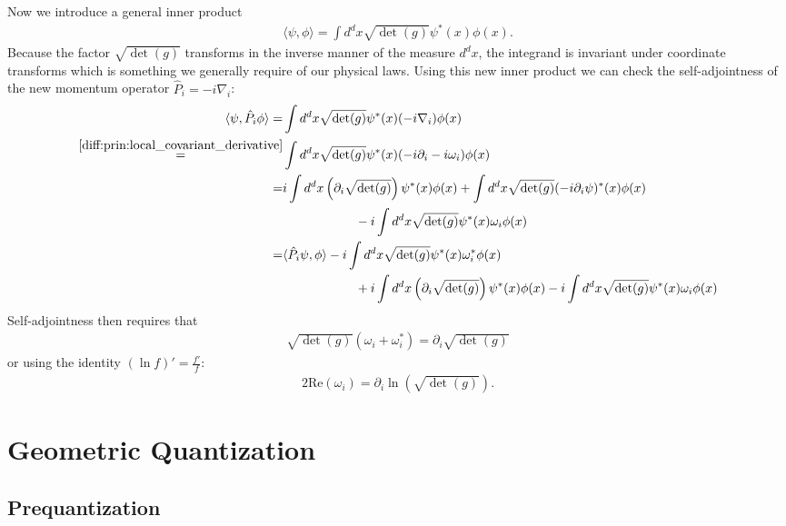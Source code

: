 \begin{construct}
		Now we introduce a general inner product
		\begin{gather}
			\langle\psi, \phi\rangle = \int d^dx\sqrt{\det(g)}\psi^*(x)\phi(x).
		\end{gather}
		Because the factor $\sqrt{\det(g)}$ transforms in the inverse manner of the measure $d^dx$, the integrand is invariant under coordinate transforms which is something we generally require of our physical laws. Using this new inner product we can check the self-adjointness of the new momentum operator $\hat{P}_i = -i\nabla_i$:
		\begin{align*}
			\langle\psi, \hat{P}_i\phi\rangle = &\int d^dx\sqrt{\det(g)}\psi^*(x)(-i\nabla_i)\phi(x)\\
			\overset{\ref{diff:prin:local_covariant_derivative}}{=} &\int d^dx\sqrt{\det(g)}\psi^*(x)(-i\partial_i - i\omega_i)\phi(x)\\
			= &i\int d^dx\left(\partial_i\sqrt{\det(g)}\right)\psi^*(x)\phi(x) + \int d^dx\sqrt{\det(g)}(-i\partial_i\psi)^*(x)\phi(x)\\
				&\hspace{2cm} -i \int d^dx\sqrt{\det(g)}\psi^*(x)\omega_i\phi(x)\\
			= &\langle\hat{P}_i\psi, \phi\rangle -i \int d^dx\sqrt{\det(g)}\psi^*(x)\omega_i^*\phi(x)\\
				&\hspace{2cm} + i\int d^dx\left(\partial_i\sqrt{\det(g)}\right)\psi^*(x)\phi(x) -i \int d^dx\sqrt{\det(g)}\psi^*(x)\omega_i\phi(x)
		\end{align*}
		Self-adjointness then requires that
		\begin{gather}
			\sqrt{\det(g)}(\omega_i + \omega_i^*) = \partial_i\sqrt{\det(g)}
		\end{gather}
		or using the identity $(\ln f)' = \frac{f'}{f}$:
		\begin{gather}
			2\text{Re}(\omega_i) = \partial_i\ln\left(\sqrt{\det(g)}\right).
		\end{gather}
	\end{construct}

\section{Geometric Quantization}\label{section:geometric_quantization}
\subsection{Prequantization}

